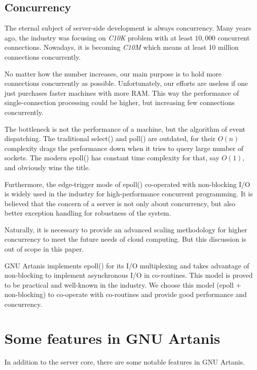 \documentclass[numbers,numberedpars]{sigplanconf}
\begin{document}
\subsection{Concurrency} \label{Concurrency}

The eternal subject of server-side development is always concurrency.
Many years ago, the industry was focusing on {\it C10K} problem with at least $10,000$ concurrent connections. Nowadays, it is becoming {\it C10M} which means at least 10 million connections concurrently.

No matter how the number increases, our main purpose is to hold more connections concurrently as possible. Unfortunately, our efforts are useless if one just purchases faster machines with more RAM. This way the performance of single-connection
processing could be higher, but increasing few connections concurrently.

The bottleneck is not the performance of a machine, but the algorithm of event dispatching. The traditional select() and poll() are outdated, for their $O(n)$ complexity drags the performance down when it tries to query large number of sockets. 
The modern epoll() has constant time complexity for that, say $O(1)$, and obviously wins the title.

Furthermore, the edge-trigger mode of epoll() co-operated with non-blocking I/O is widely used in the industry for high-performance concurrent programming.
It is believed that the concern of a server is not only about concurrency, but also better exception handling for robustness of the system.

Naturally, it is necessary to provide an advanced scaling methodology for higher concurrency to meet the future needs of cloud computing. But this discussion is out
of scope in this paper.

GNU Artanis implements epoll() for its I/O multiplexing and takes advantage of 
non-blocking to implement asynchronous I/O in co-routines. This model is proved to be practical and well-known in the industry. We choose this model (epoll + non-blocking) to co-operate with co-routines and provide good performance and concurrency.

\section{Some features in GNU Artanis} \label{Some features in GNU Artanis}

In addition to the server core, there are some notable features in GNU Artanis.
\end{document}
